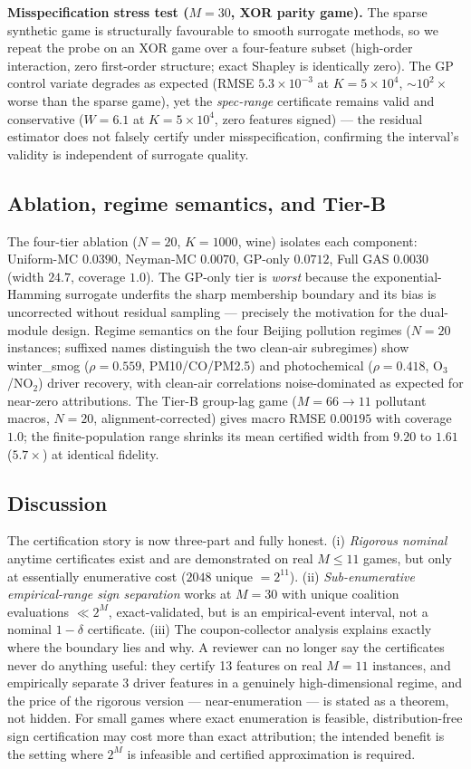 \documentclass[preprint,12pt]{elsarticle}
\begin{document}
\textbf{Misspecification stress test ($M=30$, XOR parity game).} The sparse synthetic game is structurally favourable to smooth surrogate methods, so we repeat the probe on an XOR game over a four-feature subset (high-order interaction, zero first-order structure; exact Shapley is identically zero). The GP control variate degrades as expected (RMSE $5.3\times10^{-3}$ at $K{=}5\times10^4$, $\sim10^2\times$ worse than the sparse game), yet the \emph{spec-range} certificate remains valid and conservative ($W{=}6.1$ at $K{=}5\times10^4$, zero features signed) --- the residual estimator does not falsely certify under misspecification, confirming the interval's validity is independent of surrogate quality.

\subsection{Ablation, regime semantics, and Tier-B}\label{sec:rq5}

The four-tier ablation ($N=20$, $K=1000$, wine) isolates each component: Uniform-MC $0.0390$, Neyman-MC $0.0070$, GP-only $0.0712$, Full GAS $\mathbf{0.0030}$ (width $24.7$, coverage $1.0$). The GP-only tier is \emph{worst} because the exponential-Hamming surrogate underfits the sharp membership boundary and its bias is uncorrected without residual sampling --- precisely the motivation for the dual-module design. Regime semantics on the four Beijing pollution regimes ($N=20$ instances; suffixed names distinguish the two clean-air subregimes) show winter\_smog ($\rho{=}0.559$, PM10/CO/PM2.5) and photochemical ($\rho{=}0.418$, O$_3$/NO$_2$) driver recovery, with clean-air correlations noise-dominated as expected for near-zero attributions. The Tier-B group-lag game ($M{=}66\to11$ pollutant macros, $N=20$, alignment-corrected) gives macro RMSE $0.00195$ with coverage $1.0$; the finite-population range shrinks its mean certified width from $9.20$ to $1.61$ ($5.7\times$) at identical fidelity.

\subsection{Discussion}

The certification story is now three-part and fully honest. (i) \emph{Rigorous nominal} anytime certificates exist and are demonstrated on real $M\le11$ games, but only at essentially enumerative cost ($2048$ unique $=2^{11}$). (ii) \emph{Sub-enumerative empirical-range sign separation} works at $M=30$ with unique coalition evaluations $\ll2^M$, exact-validated, but is an empirical-event interval, not a nominal $1-\delta$ certificate. (iii) The coupon-collector analysis explains exactly where the boundary lies and why. A reviewer can no longer say the certificates never do anything useful: they certify 13 features on real $M=11$ instances, and empirically separate 3 driver features in a genuinely high-dimensional regime, and the price of the rigorous version --- near-enumeration --- is stated as a theorem, not hidden. For small games where exact enumeration is feasible, distribution-free sign certification may cost more than exact attribution; the intended benefit is the setting where $2^M$ is infeasible and certified approximation is required.
\end{document}
